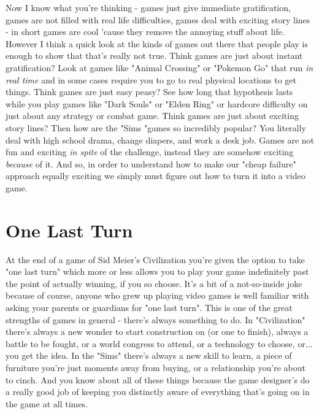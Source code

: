 \documentclass[11pt,a5paper]{book}
\begin{document}
Now I know what you're thinking - games just give immediate gratification, games are not filled with real life difficulties, games deal with exciting story lines - in short games are cool 'cause they remove the annoying stuff about life. However I think a quick look at the kinds of games out there that people play is enough to show that that's really not true. Think games are just about instant gratification? Look at games like "Animal Crossing" or "Pokemon Go" that run \textit{in real time} and in some cases require you to go to real physical locations to get things. Think games are just easy peasy? See how long that hypothesis lasts while you play games like "Dark Souls" or "Elden Ring" or hardcore difficulty on just about any strategy or combat game. Think games are just about exciting story lines? Then how are the "Sims "games so incredibly popular? You literally deal with high school drama, change diapers, and work a desk job. Games are not fun and exciting \textit{in spite} of the challenge, instead they are somehow exciting \textit{because} of it. And so, in order to understand how to make our "cheap failure" approach equally exciting we simply must figure out how to turn it into a video game. 

\section{One Last Turn}
At the end of a game of Sid Meier's Civilization you're given the option to take "one last turn" which more or less allows you to play your game indefinitely past the point of actually winning, if you so choose. It's a bit of a not-so-inside joke because of course, anyone who grew up playing video games is well familiar with asking your parents or guardians for "one last turn". This is one of the great strengths of games in general - there's always something to do. In "Civilization" there's always a new wonder to start construction on (or one to finish), always a battle to be fought, or a world congress to attend, or a technology to choose, or... you get the idea. In the "Sims" there's always a new skill to learn, a piece of furniture you're just moments away from buying, or a relationship you're about to cinch. And you know about all of these things because the game designer's do a really good job of keeping you distinctly aware of everything that's going on in the game at all times. 
\newline
\end{document}
